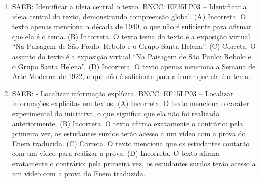 \begin{enumerate}
\item
SAEB: Identificar a ideia central o texto. BNCC: EF35LP03 -- Identificar a ideia central do texto, demonstrando compreensão global. 
(A) Incorreta. O texto apenas menciona a década de 1940, o que não é suficiente para afirmar que ela é o tema. 
(B) Incorreta. O texto tema do texto é a exposição virtual ``Na Paisagem de São Paulo: Rebolo e o Grupo Santa Helena''. 
(C) Correta. O assunto do texto é a exposição virtual ``Na Paisagem de São Paulo: Rebolo e o Grupo Santa Helena''. 
(D) Incorreta. O texto apenas menciona a Semana de Arte Moderna de 1922, o que não é suficiente para afirmar que ela é o tema.

\item
SAEB: - Localizar informação explícita. BNCC: EF15LP03 -- Localizar informações explícitas em textos. 
(A) Incorreta. O texto menciona o caráter experimental da iniciativa, o que significa que ela não foi realizada anteriormente. 
(B) Incorreta. O texto afirma exatamente o contrário: pela primeira vez, os estudantes surdos terão acesso a um vídeo com a prova do Enem traduzida. 
(C) Correta. O texto menciona que os estudantes contarão com um vídeo para realizar a prova. 
(D) Incorreta. O texto afirma exatamente o contrário: pela primeira vez, os estudantes surdos terão acesso a um vídeo com a prova do Enem traduzida.
\end{enumerate}